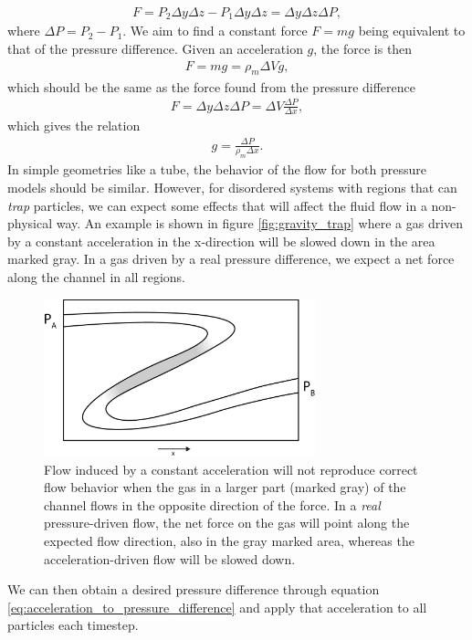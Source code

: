 \begin{align}
	F = P_2\Delta y\Delta z - P_1\Delta y\Delta z = \Delta y\Delta z\Delta P,
\end{align}
where $\Delta P = P_2 - P_1$. We aim to find a constant force $F=mg$ being equivalent to that of the pressure difference. Given an acceleration $g$, the force is then
\begin{align}
	F = mg = \rho_m \Delta V g,
\end{align}
which should be the same as the force found from the pressure difference
\begin{align}
	F = \Delta y\Delta z\Delta P = \Delta V \frac{\Delta P}{\Delta x},	
\end{align}
which gives the relation
\begin{align}
	\label{eq:acceleration_to_pressure_difference}
	g = \frac{\Delta P}{\rho_m\Delta x}.
\end{align}
In simple geometries like a tube, the behavior of the flow for both pressure models should be similar. However, for disordered systems with regions that can \textit{trap} particles, we can expect some effects that will affect the fluid flow in a non-physical way. An example is shown in figure \ref{fig:gravity_trap} where a gas driven by a constant acceleration in the x-direction will be slowed down in the area marked gray. In a gas driven by a real pressure difference, we expect a net force along the channel in all regions.
\begin{figure}[h]
\begin{center}
\includegraphics[width=0.7\textwidth, trim=0cm 0cm 0cm 0cm, clip]{DSMC/figures/gravity_problem.eps}
\end{center}
\caption{Flow induced by a constant acceleration will not reproduce correct flow behavior when the gas in a larger part (marked gray) of the channel flows in the opposite direction of the force. In a \textit{real} pressure-driven flow, the net force on the gas will point along the expected flow direction, also in the gray marked area, whereas the acceleration-driven flow will be slowed down.}
\label{fig:gravity_problem}
\end{figure}
We can then obtain a desired pressure difference through equation \eqref{eq:acceleration_to_pressure_difference} and apply that acceleration to all particles each timestep.